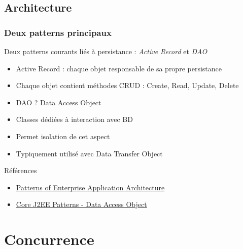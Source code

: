 \documentclass[english, french]{beamer}
\begin{document}
\subsection{Architecture}
\begin{frame}
	\frametitle{Deux patterns principaux}
	Deux patterns courants liés à persistance : \emph{Active Record} et \emph{DAO}
	\begin{itemize}
		\item Active Record : chaque objet responsable de sa propre persistance
		\item Chaque objet contient méthodes CRUD : Create, Read, Update, Delete
		\item DAO ? \pause Data Access Object \pause
		\item Classes dédiées à interaction avec BD
		\item Permet isolation de cet aspect
		\item Typiquement utilisé avec Data Transfer Object
	\end{itemize}
	\begin{block}{Références}
		\begin{itemize}
			\item \href{http://gen.lib.rus.ec/book/index.php?md5=37E9F4F25E3C5609E14415472408B80C}{Patterns of Enterprise Application Architecture}
			\item \href{http://www.oracle.com/technetwork/java/dataaccessobject-138824.html}{Core J2EE Patterns - Data Access Object}
		\end{itemize}
	\end{block}
\end{frame}

\section{Concurrence}
\newlength{\JEEIsolVert}
\newlength{\JEEIsolBefTr}
\newlength{\JEEIsolOuter}
\setlength{\JEEIsolVert}{3mm}
\setlength{\JEEIsolBefTr}{1.2cm}
\setlength{\JEEIsolOuter}{3mm}
\end{document}
